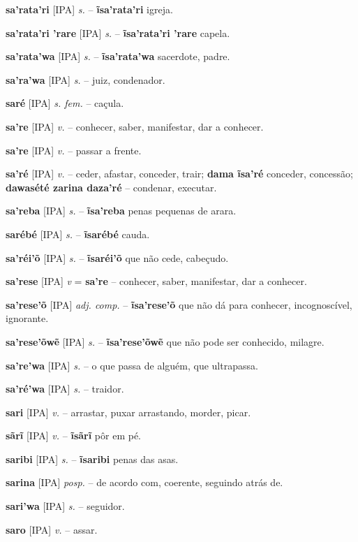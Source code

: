 \textbf{sa'rata'ri} [IPA] \textit{s.} -- \textbf{ĩsa'rata'ri} igreja.

\textbf{sa'rata'ri 'rare} [IPA] \textit{s.} -- \textbf{ĩsa'rata'ri 'rare} capela.

\textbf{sa'rata'wa} [IPA] \textit{s.} -- \textbf{ĩsa'rata'wa} sacerdote, padre.

\textbf{sa'ra'wa} [IPA] \textit{s.} -- juiz, condenador.

\textbf{saré} [IPA] \textit{s. fem.} -- caçula.

\textbf{sa're} [IPA] \textit{v.} -- conhecer, saber, manifestar, dar a conhecer.

\textbf{sa're} [IPA] \textit{v.} -- passar a frente.

\textbf{sa'ré} [IPA] \textit{v.} -- ceder, afastar, conceder, trair; \textbf{dama ĩsa'ré} conceder, concessão; \textbf{dawasété zarina daza'ré} -- condenar, executar.

\textbf{sa'reba} [IPA] \textit{s.} -- \textbf{ĩsa'reba} penas pequenas de arara.

\textbf{sarébé} [IPA] \textit{s.} -- \textbf{ĩsarébé} cauda.

\textbf{sa'réi'õ} [IPA] \textit{s.} -- \textbf{ĩsaréi'õ} que não cede, cabeçudo.

\textbf{sa'rese} [IPA] \textit{v} = \textbf{sa're} -- conhecer, saber, manifestar, dar a conhecer.

\textbf{sa'rese'õ} [IPA] \textit{adj. comp.} -- \textbf{ĩsa'rese'õ} que não dá para conhecer, incognoscível, ignorante.

\textbf{sa'rese'õwẽ} [IPA] \textit{s.} -- \textbf{ĩsa'rese'õwẽ} que não pode ser conhecido, milagre.

\textbf{sa're'wa} [IPA] \textit{s.} -- o que passa de alguém, que ultrapassa.

\textbf{sa'ré'wa} [IPA] \textit{s.} -- traidor.

\textbf{sari} [IPA] \textit{v.} -- arrastar, puxar arrastando, morder, picar.

\textbf{sãrĩ} [IPA] \textit{v.} -- \textbf{ĩsãrĩ} pôr em pé.

\textbf{saribi} [IPA] \textit{s.} -- \textbf{ĩsaribi} penas das asas.

\textbf{sarina} [IPA] \textit{posp.} -- de acordo com, coerente, seguindo atrás de.

\textbf{sari'wa} [IPA] \textit{s.} -- seguidor.

\textbf{saro} [IPA] \textit{v.} -- assar.

